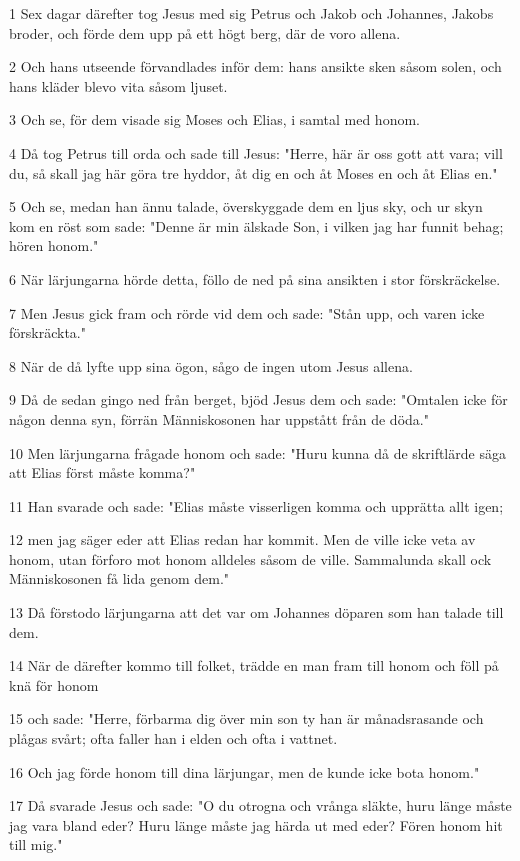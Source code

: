 \par 1 Sex dagar därefter tog Jesus med sig Petrus och Jakob och Johannes, Jakobs broder, och förde dem upp på ett högt berg, där de voro allena.
\par 2 Och hans utseende förvandlades inför dem: hans ansikte sken såsom solen, och hans kläder blevo vita såsom ljuset.
\par 3 Och se, för dem visade sig Moses och Elias, i samtal med honom.
\par 4 Då tog Petrus till orda och sade till Jesus: "Herre, här är oss gott att vara; vill du, så skall jag här göra tre hyddor, åt dig en och åt Moses en och åt Elias en."
\par 5 Och se, medan han ännu talade, överskyggade dem en ljus sky, och ur skyn kom en röst som sade: "Denne är min älskade Son, i vilken jag har funnit behag; hören honom."
\par 6 När lärjungarna hörde detta, föllo de ned på sina ansikten i stor förskräckelse.
\par 7 Men Jesus gick fram och rörde vid dem och sade: "Stån upp, och varen icke förskräckta."
\par 8 När de då lyfte upp sina ögon, sågo de ingen utom Jesus allena.
\par 9 Då de sedan gingo ned från berget, bjöd Jesus dem och sade: "Omtalen icke för någon denna syn, förrän Människosonen har uppstått från de döda."
\par 10 Men lärjungarna frågade honom och sade: "Huru kunna då de skriftlärde säga att Elias först måste komma?"
\par 11 Han svarade och sade: "Elias måste visserligen komma och upprätta allt igen;
\par 12 men jag säger eder att Elias redan har kommit. Men de ville icke veta av honom, utan förforo mot honom alldeles såsom de ville. Sammalunda skall ock Människosonen få lida genom dem."
\par 13 Då förstodo lärjungarna att det var om Johannes döparen som han talade till dem.
\par 14 När de därefter kommo till folket, trädde en man fram till honom och föll på knä för honom
\par 15 och sade: "Herre, förbarma dig över min son ty han är månadsrasande och plågas svårt; ofta faller han i elden och ofta i vattnet.
\par 16 Och jag förde honom till dina lärjungar, men de kunde icke bota honom."
\par 17 Då svarade Jesus och sade: "O du otrogna och vrånga släkte, huru länge måste jag vara bland eder? Huru länge måste jag härda ut med eder? Fören honom hit till mig."
